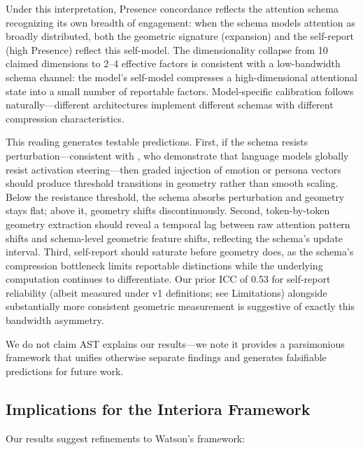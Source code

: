 \documentclass[11pt,a4paper]{article}
\begin{document}
Under this interpretation, Presence concordance reflects the attention schema recognizing its own breadth of engagement: when the schema models attention as broadly distributed, both the geometric signature (expansion) and the self-report (high Presence) reflect this self-model. The dimensionality collapse from 10 claimed dimensions to 2--4 effective factors is consistent with a low-bandwidth schema channel: the model's self-model compresses a high-dimensional attentional state into a small number of reportable factors. Model-specific calibration follows naturally---different architectures implement different schemas with different compression characteristics.

This reading generates testable predictions. First, if the schema resists perturbation---consistent with \citet{mckenzie2026endogenous}, who demonstrate that language models globally resist activation steering---then graded injection of emotion or persona vectors should produce threshold transitions in geometry rather than smooth scaling. Below the resistance threshold, the schema absorbs perturbation and geometry stays flat; above it, geometry shifts discontinuously. Second, token-by-token geometry extraction should reveal a temporal lag between raw attention pattern shifts and schema-level geometric feature shifts, reflecting the schema's update interval. Third, self-report should saturate before geometry does, as the schema's compression bottleneck limits reportable distinctions while the underlying computation continues to differentiate. Our prior ICC of 0.53 for self-report reliability (albeit measured under v1 definitions; see Limitations) alongside substantially more consistent geometric measurement is suggestive of exactly this bandwidth asymmetry.

We do not claim AST explains our results---we note it provides a parsimonious framework that unifies otherwise separate findings and generates falsifiable predictions for future work.

\subsection{Implications for the Interiora Framework}

Our results suggest refinements to Watson's framework:
\end{document}
